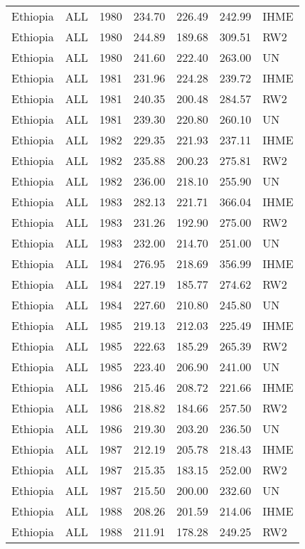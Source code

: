 \begin{longtable}{lllrrrl}
  Ethiopia & ALL & 1980 & 234.70 & 226.49 & 242.99 & IHME \\ 
  Ethiopia & ALL & 1980 & 244.89 & 189.68 & 309.51 & RW2 \\ 
  Ethiopia & ALL & 1980 & 241.60 & 222.40 & 263.00 & UN \\ 
  Ethiopia & ALL & 1981 & 231.96 & 224.28 & 239.72 & IHME \\ 
  Ethiopia & ALL & 1981 & 240.35 & 200.48 & 284.57 & RW2 \\ 
  Ethiopia & ALL & 1981 & 239.30 & 220.80 & 260.10 & UN \\ 
  Ethiopia & ALL & 1982 & 229.35 & 221.93 & 237.11 & IHME \\ 
  Ethiopia & ALL & 1982 & 235.88 & 200.23 & 275.81 & RW2 \\ 
  Ethiopia & ALL & 1982 & 236.00 & 218.10 & 255.90 & UN \\ 
  Ethiopia & ALL & 1983 & 282.13 & 221.71 & 366.04 & IHME \\ 
  Ethiopia & ALL & 1983 & 231.26 & 192.90 & 275.00 & RW2 \\ 
  Ethiopia & ALL & 1983 & 232.00 & 214.70 & 251.00 & UN \\ 
  Ethiopia & ALL & 1984 & 276.95 & 218.69 & 356.99 & IHME \\ 
  Ethiopia & ALL & 1984 & 227.19 & 185.77 & 274.62 & RW2 \\ 
  Ethiopia & ALL & 1984 & 227.60 & 210.80 & 245.80 & UN \\ 
  Ethiopia & ALL & 1985 & 219.13 & 212.03 & 225.49 & IHME \\ 
  Ethiopia & ALL & 1985 & 222.63 & 185.29 & 265.39 & RW2 \\ 
  Ethiopia & ALL & 1985 & 223.40 & 206.90 & 241.00 & UN \\ 
  Ethiopia & ALL & 1986 & 215.46 & 208.72 & 221.66 & IHME \\ 
  Ethiopia & ALL & 1986 & 218.82 & 184.66 & 257.50 & RW2 \\ 
  Ethiopia & ALL & 1986 & 219.30 & 203.20 & 236.50 & UN \\ 
  Ethiopia & ALL & 1987 & 212.19 & 205.78 & 218.43 & IHME \\ 
  Ethiopia & ALL & 1987 & 215.35 & 183.15 & 252.00 & RW2 \\ 
  Ethiopia & ALL & 1987 & 215.50 & 200.00 & 232.60 & UN \\ 
  Ethiopia & ALL & 1988 & 208.26 & 201.59 & 214.06 & IHME \\ 
  Ethiopia & ALL & 1988 & 211.91 & 178.28 & 249.25 & RW2 \\ 

\end{longtable}
